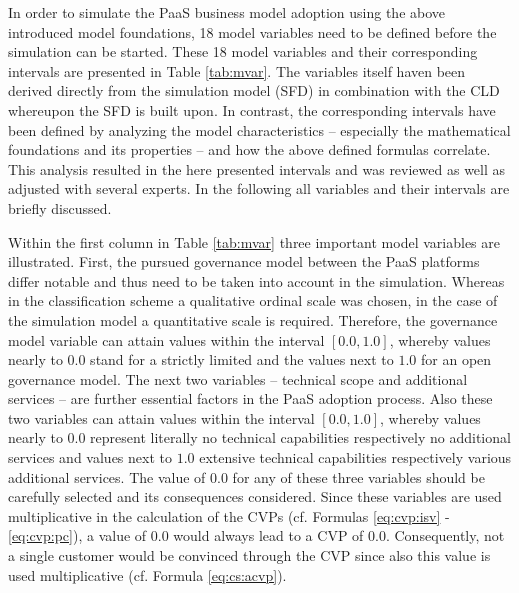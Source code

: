 In order to simulate the \ac{PaaS} business model adoption using the above introduced model foundations, 18 model variables need to be defined before the simulation can be started. These 18 model variables and their corresponding intervals are presented in Table \ref{tab:mvar}. The variables itself haven been derived directly from the simulation model (\ac{SFD}) in combination with the \ac{CLD} whereupon the \ac{SFD} is built upon. In contrast, the corresponding intervals have been defined by analyzing the model characteristics -- especially the mathematical foundations and its properties -- and how the above defined formulas correlate. This analysis resulted in the here presented intervals and was reviewed as well as adjusted with several experts. In the following all variables and their intervals are briefly discussed.

Within the first column in Table \ref{tab:mvar} three important model variables are illustrated. First, the pursued governance model between the \ac{PaaS} platforms differ notable and thus need to be taken into account in the simulation. Whereas in the classification scheme a qualitative ordinal scale was chosen, in the case of the simulation model a quantitative scale is required. Therefore, the governance model variable can attain values within the interval $[0.0,1.0]$, whereby values nearly to $0.0$ stand for a strictly limited and the values next to $1.0$ for an open governance model. The next two variables -- technical scope and additional services -- are further essential factors in the \ac{PaaS} adoption process. Also these two variables can attain values within the interval $[0.0,1.0]$, whereby values nearly to $0.0$ represent literally no technical capabilities respectively no additional services and values next to $1.0$ extensive technical capabilities respectively various additional services. The value of $0.0$ for any of these three variables should be carefully selected and its consequences considered. Since these variables are used multiplicative in the calculation of the \acp{CVP} (cf. Formulas \ref{eq:cvp:isv} - \ref{eq:cvp:pc}), a value of $0.0$ would always lead to a \ac{CVP} of $0.0$. Consequently, not a single customer would be convinced through the \ac{CVP} since also this value is used multiplicative (cf. Formula \ref{eq:cs:acvp}).

\newlength{\originalTabcolsep}
\setlength{\originalTabcolsep}{\tabcolsep}
\setlength{\tabcolsep}{1.5mm}

